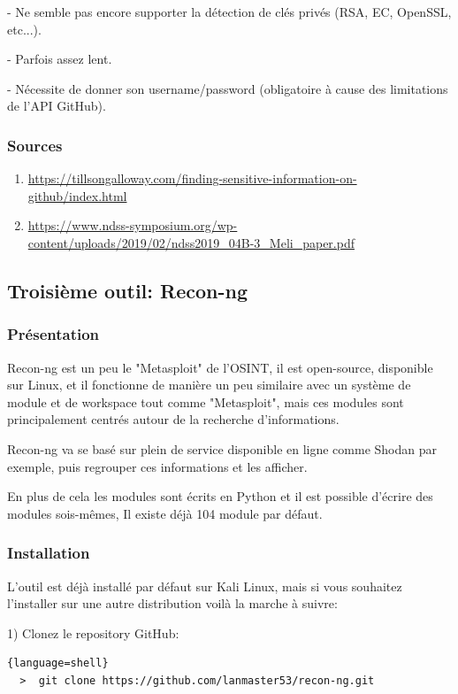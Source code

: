 - Ne semble pas encore supporter la détection de clés privés (RSA, EC, OpenSSL, etc...).

- Parfois assez lent.

- Nécessite de donner son username/password (obligatoire à cause des limitations de l'API GitHub).

\subsubsection{Sources}
\begin{enumerate}
  \item \url{https://tillsongalloway.com/finding-sensitive-information-on-github/index.html}
  \item \url{https://www.ndss-symposium.org/wp-content/uploads/2019/02/ndss2019_04B-3_Meli_paper.pdf}
\end{enumerate}

\subsection{Troisième outil: Recon-ng}

\subsubsection{Présentation}
Recon-ng est un peu le "Metasploit" de l'OSINT, il est open-source, disponible sur Linux, et il fonctionne de manière un peu similaire avec un système de module et de workspace tout comme "Metasploit",
mais ces modules sont principalement centrés autour de la recherche d'informations.

Recon-ng va se basé sur plein de service disponible en ligne comme Shodan par exemple, puis regrouper
ces informations et les afficher.

En plus de cela les modules sont écrits en Python et il est possible d'écrire des modules sois-mêmes, Il
existe déjà 104 module par défaut.

\subsubsection{Installation}
L'outil est déjà installé par défaut sur Kali Linux, mais si vous souhaitez l'installer sur une autre
distribution voilà la marche à suivre:

1) Clonez le repository GitHub:

\begin{lstlisting}{language=shell}
  >  git clone https://github.com/lanmaster53/recon-ng.git
\end{lstlisting}
  
